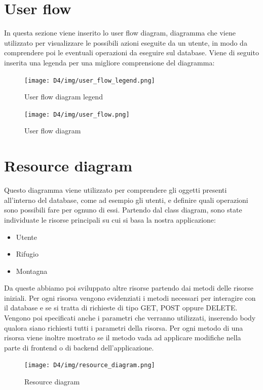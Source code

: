 \documentclass[a4paper,12pt]{article}
\begin{document}
\newpage
\section{User flow}
In questa sezione viene inserito lo user flow diagram, diagramma che viene utilizzato per visualizzare le possibili azioni eseguite da un utente, in modo da comprendere poi le eventuali operazioni da eseguire sul database.
Viene di seguito inserita una legenda per una migliore comprensione del diagramma:
\begin{figure}[H]
   \centering
   \texttt{[image: D4/img/user\_flow\_legend.png]}
    \caption{User flow diagram legend}
\end{figure}

\begin{figure}[H]
   \centering
   \texttt{[image: D4/img/user\_flow.png]}
    \caption{User flow diagram}
\end{figure}

\newpage
\section{Resource diagram}
Questo diagramma viene utilizzato per comprendere gli oggetti presenti all'interno del database, come ad esempio gli utenti, e definire quali operazioni sono possibili fare per ognuno di essi. \newline
Partendo dal class diagram, sono state individuate le risorse principali su cui si basa la nostra applicazione:
\begin{itemize}
    \item Utente
    \item Rifugio
    \item Montagna
\end{itemize}
Da queste abbiamo poi sviluppato altre risorse partendo dai metodi delle risorse iniziali. \newline
Per ogni risorsa vengono evidenziati i metodi necessari per interagire con il database e se si tratta di richieste di tipo GET, POST oppure DELETE. Vengono poi specificati anche i parametri che verranno utilizzati, inserendo body qualora siano richiesti tutti i parametri della risorsa. \newline
Per ogni metodo di una risorsa viene inoltre mostrato se il metodo vada ad applicare modifiche nella parte di frontend o di backend dell'applicazione.

\begin{figure}[H]
   \centering
   \texttt{[image: D4/img/resource\_diagram.png]}
    \caption{Resource diagram}
\end{figure}
\end{document}
